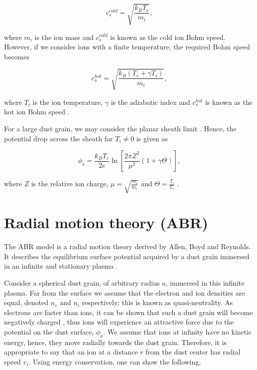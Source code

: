 \documentclass{article}
\begin{document}
\smallskip 

\begin{equation}\label{eq:ColdBohm}
c_{s}^{cold} = \sqrt{\frac{k_{B}T_{e}}{m_{i}}},
\end{equation}

\noindent where $m_i$ is the ion mass and $c_{s}^{cold}$ is known as the cold ion Bohm speed. 
However, if we consider ions with a finite temperature, the required Bohm speed becomes 

\begin{equation}\label{eq:HotBohm}
c_{s}^{hot} = \sqrt{\frac{k_{B}(T_{e} + \gamma T_{i})}{m_{i}}},
\end{equation}

\smallskip

\noindent where $T_i$ is the ion temperature, $\gamma$ is the adiabatic index
and $c_{s}^{hot}$ is known as the hot ion Bohm speed \cite{Stangeby1986} \cite{Willis} .

\medskip

For a large dust grain, we may consider the planar sheath limit \cite{Willis}. 
Hence, the potential drop across the sheath for $T_i \neq 0$ is given as

\begin{equation}\label{eq:SheathDrop}
\phi_s = \frac{k_B T_e}{2e}\ln{\left[\frac{2\pi Z^2}{\mu^2}(1 + \gamma \Theta)\right]},
\end{equation}

\noindent where $Z$ is the relative ion charge, $\mu = \sqrt{\frac{m_i}{m_e}}$ and $\Theta = \frac{T_i}{T_e}$ \cite{Stangeby1986}.

\section{Radial motion theory (ABR)}

\smallskip

The ABR model is a radial motion theory derived by Allen, Boyd and Reynolds. It describes the equilibrium surface potential acquired
by a dust grain immersed in an infinite and stationary plasma \cite{ABR}.

\medskip

Consider a spherical dust grain, of arbitrary radius $a$, immersed in this infinite plasma. Far from the surface we assume that the electron
and ion densities are equal, denoted $n_e$ and $n_i$ respectively; this is known as quasi-neutrality. As electrons are faster than ions, it can be shown that such a dust grain will become negatively 
charged \cite{Thomas}, thus ions will experience an attractive force due to the potential on the dust surface, 
$\phi_a$. We assume that ions at infinity have no kinetic energy, hence, they move radially
towards the dust grain. Therefore, it is appropriate to say that an ion at a distance 
$r$ from the dust center has radial speed $v_i$. Using energy conservation, one can show the following,
\end{document}
